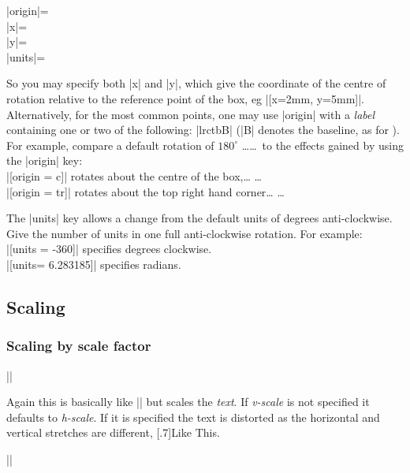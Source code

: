 \begin{decl}
|origin|=\\
|x|=\\
|y|=\\
|units|=
\end{decl}

So you may specify both |x| and |y|, which give the coordinate of
the centre of rotation relative to the reference point of the box, eg
|[x=2mm, y=5mm]|. Alternatively, for the most common points, one may use
|origin| with a \emph{label} containing one or two of the following:
|lrctbB| (|B| denotes the baseline, as for ). For
example, compare a default rotation of $180^\circ$
\ldots{}\ldots\ to the effects gained by using
the |origin| key:\\
|[origin = c]| rotates about the centre of the box,\ldots
         \ldots\\
|[origin = tr]| rotates about the top right hand corner\ldots
                   \ldots

The |units| key allows a change from the default units of degrees
anti-clockwise. Give the number of units in one full anti-clockwise
rotation. For example:\\
|[units = -360]| specifies degrees clockwise.\\
|[units= 6.283185]| specifies radians.

\subsection{Scaling}

\subsubsection{Scaling by scale factor}

\begin{decl}
|\scalebox|
\end{decl}

Again this is basically like |\mbox| but scales the \emph{text}.
If \emph{v-scale} is not specified it defaults to \emph{h-scale}.
If it is specified the text is distorted as the horizontal and
vertical stretches are different, \scalebox{3}[.7]{Like This}.


\begin{decl}
||
\end{decl}

